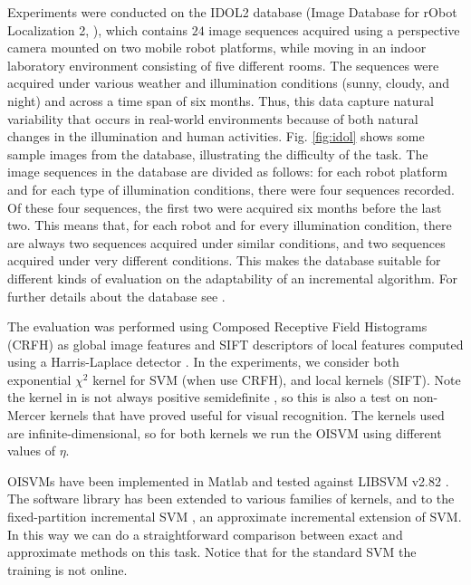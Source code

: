 Experiments were conducted on the IDOL2 database
(Image Database for rObot Localization 2, \cite{luo:idol2}), which
contains $24$ image sequences acquired using a perspective camera
mounted on two mobile robot platforms, while moving in an indoor
laboratory environment consisting of five different rooms.
The sequences were acquired under various
weather and illumination conditions (sunny, cloudy, and night) and
across a time span of six months. Thus, this data capture natural
variability that occurs in real-world environments because of both
natural changes in the illumination and human activities.
Fig. \ref{fig:idol} shows some sample images from the database,
illustrating the difficulty of the task.  The image sequences in the
database are divided as follows: for each robot platform and for each
type of illumination conditions, there were four sequences
recorded. Of these four sequences, the first two were acquired six
months before the last two. This means that, for each robot and for
every illumination condition, there are always two sequences acquired
under similar conditions, and two sequences acquired under very
different conditions. This makes the database suitable for different
kinds of evaluation on the adaptability of an incremental
algorithm. For further details about the database see \cite{luo:idol2}.

The evaluation was performed using Composed Receptive Field Histograms
(CRFH) \cite{linde:icpr04} as global image features and SIFT descriptors
\cite{lowe99object} of local features computed using a
Harris-Laplace detector \cite{HarrisS88}. In the experiments,
we consider both exponential $\chi^2$ kernel for SVM (when use CRFH),
and local kernels \cite{wallraven:iccv03} (SIFT). Note the kernel in
\cite{wallraven:iccv03} is not always positive semidefinite
\cite{fleuret:bmvc04}, so this is also a test on non-Mercer
kernels that have proved useful for visual recognition.
The kernels used are infinite-dimensional, so for both
kernels we run the OISVM using different values of $\eta$.

OISVMs have been implemented in Matlab and tested against LIBSVM v2.82
\cite{ChangL01}. The software library has been extended to various
families of kernels, and to the fixed-partition incremental SVM \cite{syed99incremental},
an approximate incremental extension of SVM.
In this way we can do a straightforward comparison
between exact and approximate methods
on this task.
Notice that for the standard SVM the training is not online.

